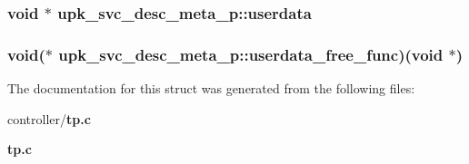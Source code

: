 \subsubsection[{userdata}]{\setlength{\rightskip}{0pt plus 5cm}void $\ast$ {\bf upk\_\-svc\_\-desc\_\-meta\_\-p::userdata}}\label{structupk__svc__desc__meta__p_a35d3e200fe3613ce3ce32ceec8905fed}
\subsubsection[{userdata\_\-free\_\-func}]{\setlength{\rightskip}{0pt plus 5cm}void($\ast$ {\bf upk\_\-svc\_\-desc\_\-meta\_\-p::userdata\_\-free\_\-func})(void $\ast$)}\label{structupk__svc__desc__meta__p_acfc9791937c9cdba54a9e1feb55b37ac}


The documentation for this struct was generated from the following files:\begin{DoxyCompactItemize}
\item 
controller/{\bf tp.c}\item 
{\bf tp.c}\end{DoxyCompactItemize}
